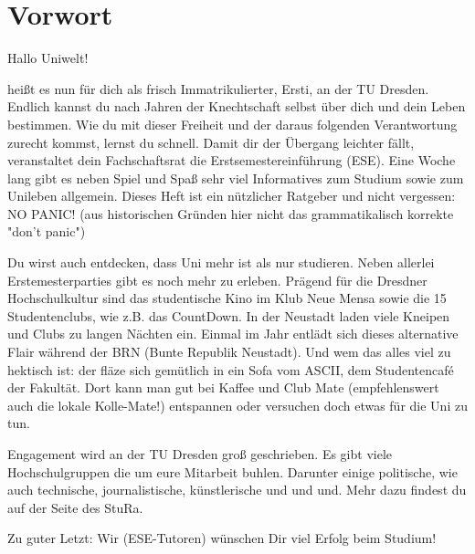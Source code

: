 \section{Vorwort}


Hallo Uniwelt!

heißt es nun für dich als frisch Immatrikulierter, Ersti, an der TU Dresden. Endlich kannst du nach Jahren der Knechtschaft selbst über dich und dein Leben bestimmen. Wie du mit dieser Freiheit und der daraus folgenden Verantwortung zurecht kommst, lernst du schnell. Damit dir der Übergang leichter fällt, veranstaltet dein Fachschaftsrat die Erstsemestereinführung (ESE). Eine Woche lang gibt es neben Spiel und Spaß sehr viel Informatives zum Studium sowie zum Unileben allgemein. Dieses Heft ist ein nützlicher Ratgeber und nicht vergessen: NO PANIC! (aus historischen Gründen hier nicht das grammatikalisch korrekte "don't panic")

Du wirst auch entdecken, dass Uni mehr ist als nur studieren. Neben allerlei Erstemesterparties gibt es noch mehr zu erleben. Prägend für die Dresdner Hochschulkultur sind das studentische Kino im Klub Neue Mensa sowie die 15 Studentenclubs, wie z.B. das CountDown. In der Neustadt laden viele Kneipen und Clubs zu langen Nächten ein. Einmal im Jahr entlädt sich dieses alternative Flair während der BRN (Bunte Republik Neustadt). Und wem das alles viel zu hektisch ist: der fläze sich gemütlich in ein Sofa vom ASCII, dem Studentencafé der Fakultät. Dort kann man gut bei Kaffee und Club Mate (empfehlenswert auch die lokale Kolle-Mate!) entspannen oder versuchen doch etwas für die Uni zu tun.

Engagement wird an der TU Dresden groß geschrieben. Es gibt viele Hochschulgruppen die um eure Mitarbeit buhlen. Darunter einige politische, wie auch technische, journalistische, künstlerische und und und. Mehr dazu findest du auf der Seite des StuRa.

Zu guter Letzt: Wir (ESE-Tutoren) wünschen Dir viel Erfolg beim Studium!